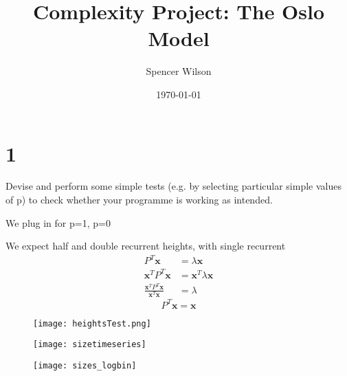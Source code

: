 \documentclass[12pt]{report}
\begin{document}
\title{Complexity Project: The Oslo Model}
\author{Spencer Wilson}
\date{\today}
\maketitle

\newpage





\section*{1}

Devise and perform some simple tests (e.g. by selecting particular simple values of p) to check whether your programme is working as intended.

We plug in for p=1, p=0 

We expect half and double recurrent heights, with single recurrent 
%
\begin{align*}
P^T\textbf{x} &= \lambda{\textbf{x}} \\ 
\textbf{x}^TP^T\textbf{x} &= \textbf{x}^T\lambda{\textbf{x}} \\
\frac{\textbf{x}^TP^T\textbf{x}}{\textbf{x}^T\textbf{x}} &= \lambda 
\end{align*}
%
\begin{equation*}
P^T\textbf{x} = \textbf{x}	
\end{equation*}
%
\begin{figure}[htbp]
\begin{center}
\texttt{[image: heightsTest.png]}
\caption{}
\label{heightsTest}
\end{center}
\end{figure}
%
\begin{figure}[htbp]
\begin{center}
\texttt{[image: sizetimeseries]}
\caption{}
\label{sizetimeseries}
\end{center}
\end{figure}
%
\begin{figure}[htbp]
\begin{center}
\texttt{[image: sizes\_logbin]}
\caption{}
\label{sizes_logbin}
\end{center}
\end{figure}
\end{document}

